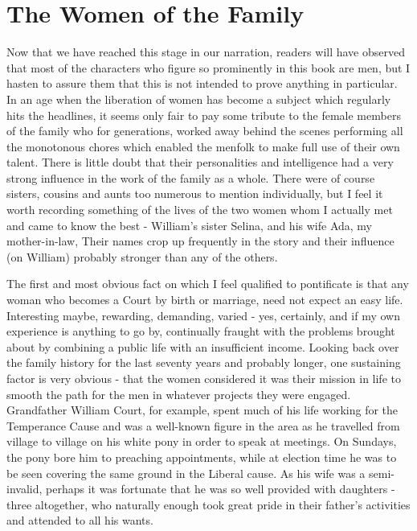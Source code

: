 \chapter{The Women of the Family}

Now that we have reached this stage in our narration, readers will have observed that most of the characters who figure so prominently in this book are men, but I hasten to assure them that this is not intended to prove anything in particular. In an age when the liberation of women has become a subject which regularly hits the headlines, it seems only fair to pay some tribute to the female members of the family who for generations, worked away behind the scenes performing all the monotonous chores which enabled the menfolk to make full use of their own talent. There is little doubt that their personalities and intelligence had a very strong influence in the work of the family as a whole. There were of course sisters, cousins and aunts too numerous to mention individually, but I feel it worth recording something of the lives of the two women whom I actually met and came to know the best - William's sister Selina, and his wife Ada, my mother-in-law, Their names crop up frequently in the story and their influence (on William) probably stronger than any of the others.

The first and most obvious fact on which I feel qualified to pontificate is that any woman who becomes a Court by birth or marriage, need not expect an easy life. Interesting maybe, rewarding, demanding, varied - yes, certainly, and if my own experience is anything to go by, continually fraught with the problems brought about by combining a public life with an insufficient income. Looking back over the family history for the last seventy years and probably longer, one sustaining factor is very obvious - that the women considered it was their mission in life to smooth the path for the men in whatever projects they were engaged. Grandfather William Court, for example, spent much of his life working for the Temperance Cause and was a well-known figure in the area as he travelled from village to village on his white pony in order to speak at meetings. On Sundays, the pony bore him to preaching appointments, while at election time he was to be seen covering the same ground in the Liberal cause. As his wife was a semi-invalid, perhaps it was fortunate that he was so well provided with daughters - three altogether, who naturally enough took great pride in their father's activities and attended to all his wants.

